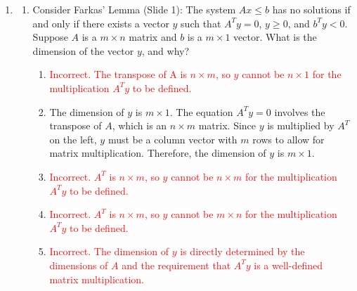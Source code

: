 \documentclass{article}%
\newcommand{\incorrect}[1]{\textcolor{red}{#1}}
\begin{document}
\begin{enumerate}
\begin{enumerate}%
\item \incorrect{Incorrect. The dimension of $y$ must match the number of rows in $A$, which is 3.}%
\item The correct answer is B.  Since $A$ is a $3 \times 2$ matrix, $A^T$ is a $2 \times 3$ matrix.  For the equation $A^T y = 0$ to be consistent, $y$ must be a $3 \times 1$ vector.  Farkas' Lemma states that if $Ax \le b$ has no solution, then such a $y$ exists, confirming the infeasibility of the original system.%
\item \incorrect{Incorrect. The existence of such a $y$ indicates infeasibility, not feasibility.}%
\item \incorrect{Incorrect. While the dimension is correct, the interpretation is wrong; the existence of $y$ signifies infeasibility.}%
\item \incorrect{Incorrect. The dimensions of $y$ are directly determined by the dimensions of $A$.}%
\end{enumerate}%
\vspace{1em}%
\item%
\begin{enumerate}%
\item Consider Farkas' Lemma (Slide 1): The system $Ax \le b$ has no solutions if and only if there exists a vector $y$ such that $A^T y = 0$, $y \ge 0$, and $b^T y < 0$.  Suppose $A$ is a $m \times n$ matrix and $b$ is a $m \times 1$ vector. What is the dimension of the vector $y$, and why?%
\begin{enumerate}%
\item \incorrect{Incorrect.  The transpose of A is $n \times m$, so $y$ cannot be $n \times 1$ for the multiplication $A^T y$ to be defined.}%
\item The dimension of $y$ is $m \times 1$.  The equation $A^T y = 0$ involves the transpose of $A$, which is an $n \times m$ matrix.  Since $y$ is multiplied by $A^T$ on the left, $y$ must be a column vector with $m$ rows to allow for matrix multiplication.  Therefore, the dimension of $y$ is $m \times 1$.%
\item \incorrect{Incorrect.  $A^T$ is $n \times m$, so $y$ cannot be $n \times m$ for the multiplication $A^T y$ to be defined.}%
\item \incorrect{Incorrect.  $A^T$ is $n \times m$, so $y$ cannot be $m \times n$ for the multiplication $A^T y$ to be defined.}%
\item \incorrect{Incorrect. The dimension of $y$ is directly determined by the dimensions of $A$ and the requirement that $A^T y$ is a well-defined matrix multiplication.}%

\end{enumerate}
\end{enumerate}
\end{enumerate}
\end{document}
